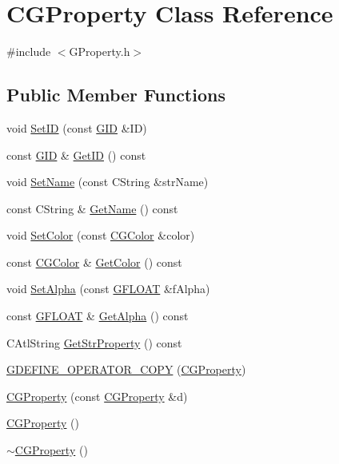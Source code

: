 \hypertarget{class_c_g_property}{}\section{C\+G\+Property Class Reference}
\label{class_c_g_property}


{\ttfamily \#include $<$G\+Property.\+h$>$}

\subsection*{Public Member Functions}
\begin{DoxyCompactItemize}
\item 
void \hyperlink{class_c_g_property_a4d8596e74b65e8cf618dc3b441842447}{Set\+I\+D} (const \hyperlink{_g_types_8h_a5b96ecb16d8e437977d12cd40aa6f6d8}{G\+I\+D} \&I\+D)
\item 
const \hyperlink{_g_types_8h_a5b96ecb16d8e437977d12cd40aa6f6d8}{G\+I\+D} \& \hyperlink{class_c_g_property_a190865e345a55267ab89f6a539b8c774}{Get\+I\+D} () const 
\item 
void \hyperlink{class_c_g_property_ac9e63e7b171de28c25a06c281adb5827}{Set\+Name} (const C\+String \&str\+Name)
\item 
const C\+String \& \hyperlink{class_c_g_property_afbcb65a1a5be1d8d4f0ec95f437e3ddf}{Get\+Name} () const 
\item 
void \hyperlink{class_c_g_property_a74b7648b77fbdbe2174d467a8be0054c}{Set\+Color} (const \hyperlink{class_c_g_color}{C\+G\+Color} \&color)
\item 
const \hyperlink{class_c_g_color}{C\+G\+Color} \& \hyperlink{class_c_g_property_a6c270411a0024ec720fd3f2a928357a4}{Get\+Color} () const 
\item 
void \hyperlink{class_c_g_property_ac778cc4bda036ac28a7daa3fa558fe58}{Set\+Alpha} (const \hyperlink{_g_types_8h_abf6eba8223df62f199b811a6c52ff2ef}{G\+F\+L\+O\+A\+T} \&f\+Alpha)
\item 
const \hyperlink{_g_types_8h_abf6eba8223df62f199b811a6c52ff2ef}{G\+F\+L\+O\+A\+T} \& \hyperlink{class_c_g_property_a30b254eca305a8ef274224645ad189ce}{Get\+Alpha} () const 
\item 
C\+Atl\+String \hyperlink{class_c_g_property_af0169dafc494e32839949d5c0f624cbf}{Get\+Str\+Property} () const 
\item 
\hyperlink{class_c_g_property_a4bc38c9be695462d277920213224915f}{G\+D\+E\+F\+I\+N\+E\+\_\+\+O\+P\+E\+R\+A\+T\+O\+R\+\_\+\+C\+O\+P\+Y} (\hyperlink{class_c_g_property}{C\+G\+Property})
\item 
\hyperlink{class_c_g_property_a0630a3a3b4862b16aefc2fec04a41f02}{C\+G\+Property} (const \hyperlink{class_c_g_property}{C\+G\+Property} \&d)
\item 
\hyperlink{class_c_g_property_a541d9e72838d0352acc7f0a6995bab07}{C\+G\+Property} ()
\item 
\hyperlink{class_c_g_property_a9dd437cf03459bcf17048e8227137ad8}{$\sim$\+C\+G\+Property} ()
\end{DoxyCompactItemize}


